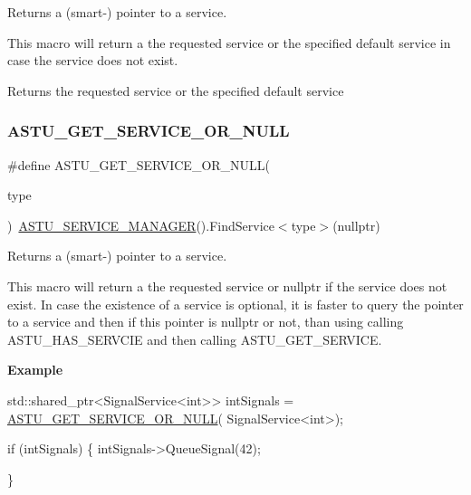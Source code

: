 Returns a (smart-\/) pointer to a service.

This macro will return a the requested service or the specified default service in case the service does not exist.

\begin{DoxyReturn}{Returns}
the requested service or the specified default service 
\end{DoxyReturn}
\mbox{\label{group__srv__group_ga223765690bb6ade99e1e5f954f096cfb}} 
\subsubsection{\texorpdfstring{A\+S\+T\+U\+\_\+\+G\+E\+T\+\_\+\+S\+E\+R\+V\+I\+C\+E\+\_\+\+O\+R\+\_\+\+N\+U\+LL}{ASTU\_GET\_SERVICE\_OR\_NULL}}
{\footnotesize\ttfamily \#define A\+S\+T\+U\+\_\+\+G\+E\+T\+\_\+\+S\+E\+R\+V\+I\+C\+E\+\_\+\+O\+R\+\_\+\+N\+U\+LL(\begin{DoxyParamCaption}\item[{}]{type }\end{DoxyParamCaption})~\hyperlink{group__srv__group_ga5216c57cf872d6a0c05d0e6f33c66fc7}{A\+S\+T\+U\+\_\+\+S\+E\+R\+V\+I\+C\+E\+\_\+\+M\+A\+N\+A\+G\+ER}().Find\+Service$<$type$>$(nullptr)}

Returns a (smart-\/) pointer to a service.

This macro will return a the requested service or {\ttfamily nullptr} if the service does not exist. In case the existence of a service is optional, it is faster to query the pointer to a service and then if this pointer is {\ttfamily nullptr} or not, than using calling {\ttfamily A\+S\+T\+U\+\_\+\+H\+A\+S\+\_\+\+S\+E\+R\+V\+C\+IE} and then calling {\ttfamily A\+S\+T\+U\+\_\+\+G\+E\+T\+\_\+\+S\+E\+R\+V\+I\+CE}.

{\bfseries Example}


\begin{DoxyCode}
std::shared\_ptr<SignalService<int>> intSignals = \hyperlink{group__srv__group_ga223765690bb6ade99e1e5f954f096cfb}{ASTU\_GET\_SERVICE\_OR\_NULL}(
      SignalService<int>);

\textcolor{keywordflow}{if} (intSignals) \{
  intSignals->QueueSignal(42);

\}
\end{DoxyCode}


